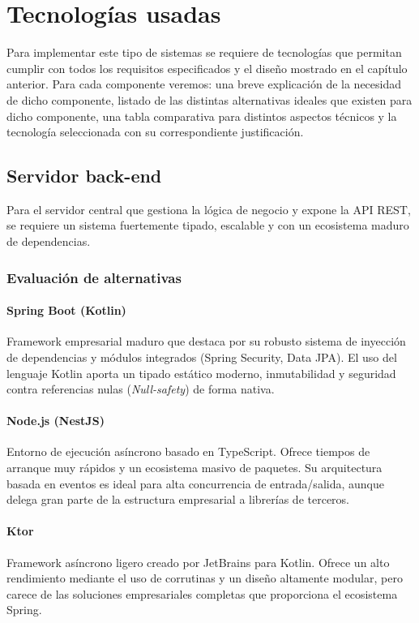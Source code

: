 \chapter{Tecnologías usadas}
\label{ch:tech}

Para implementar este tipo de sistemas se requiere de tecnologías que permitan cumplir con todos los requisitos especificados y el diseño mostrado en el capítulo anterior. Para cada componente veremos: una breve explicación de la necesidad de dicho componente, listado de las distintas alternativas ideales que existen para dicho componente, una tabla comparativa para distintos aspectos técnicos y la tecnología seleccionada con su correspondiente justificación. 

\section{Servidor back-end}

Para el servidor central que gestiona la lógica de negocio y expone la API REST, se requiere un sistema fuertemente tipado, escalable y con un ecosistema maduro de dependencias.

\subsection*{Evaluación de alternativas}

\subsubsection*{Spring Boot (Kotlin)}
Framework empresarial maduro que destaca por su robusto sistema de inyección de dependencias y módulos integrados (Spring Security, Data JPA). El uso del lenguaje Kotlin aporta un tipado estático moderno, inmutabilidad y seguridad contra referencias nulas (\emph{Null-safety}) de forma nativa.

\subsubsection*{Node.js (NestJS)}
Entorno de ejecución asíncrono basado en TypeScript. Ofrece tiempos de arranque muy rápidos y un ecosistema masivo de paquetes. Su arquitectura basada en eventos es ideal para alta concurrencia de entrada/salida, aunque delega gran parte de la estructura empresarial a librerías de terceros.

\subsubsection*{Ktor}
Framework asíncrono ligero creado por JetBrains para Kotlin. Ofrece un alto rendimiento mediante el uso de corrutinas y un diseño altamente modular, pero carece de las soluciones empresariales completas que proporciona el ecosistema Spring.

